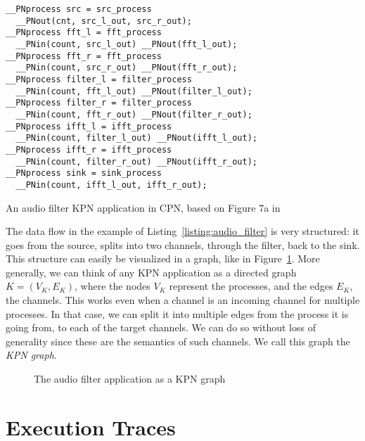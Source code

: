 \begin{listing}
\begin{verbatim}
__PNprocess src = src_process
  __PNout(cnt, src_l_out, src_r_out);
__PNprocess fft_l = fft_process
  __PNin(count, src_l_out) __PNout(fft_l_out);
__PNprocess fft_r = fft_process
  __PNin(count, src_r_out) __PNout(fft_r_out);
__PNprocess filter_l = filter_process
  __PNin(count, fft_l_out) __PNout(filter_l_out);
__PNprocess filter_r = filter_process
  __PNin(count, fft_r_out) __PNout(filter_r_out);
__PNprocess ifft_l = ifft_process
  __PNin(count, filter_l_out) __PNout(ifft_l_out);
__PNprocess ifft_r = ifft_process
  __PNin(count, filter_r_out) __PNout(ifft_r_out);
__PNprocess sink = sink_process
  __PNin(count, ifft_l_out, ifft_r_out);
\end{verbatim}
\caption{An audio filter \ac{KPN} application in \ac{CPN}, based on Figure 7a in \cite{cpn}}
\label{listing:audio_filter}
\end{listing}

The data flow in the example of Listing~\ref{listing:audio_filter} is very structured: it goes from the source, splits into two channels, through the filter, back to the sink.
This structure can easily be visualized in a graph, like in Figure~\ref{fig:audio_filter_graph}.
More generally, we can think of any \ac{KPN} application as a directed graph $K = (V_K,E_K)$, where the nodes $V_K$ represent the processes, and the edges $E_K$, the channels.
This works even when a channel is an incoming channel for multiple processes.
In that case, we can split it into multiple edges from the process it is going from, to each of the target channels.
We can do so without loss of generality since these are the semantics of such channels. 
We call this graph the \emph{\ac{KPN} graph}.

\begin{figure}[h]
	\centering
\resizebox{0.9\textwidth}{!}{
\begin{tikzpicture}
   
 \end{tikzpicture}
}
   \caption{The audio filter application as a \ac{KPN} graph}
	\label{fig:audio_filter_graph}
\end{figure}

\section{Execution Traces}
\label{sec:traces}

